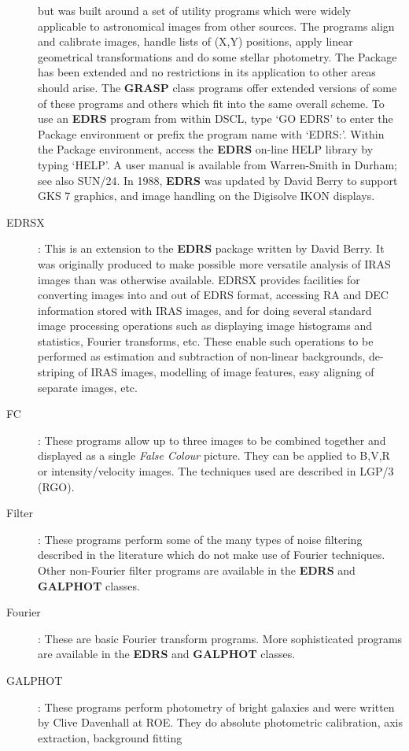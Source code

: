 \begin{description}
but was built around a set of utility programs which were widely applicable
to astronomical images from other sources.
The programs align and calibrate images, handle lists of (X,Y) positions, apply
linear geometrical transformations and do some stellar photometry.
The Package has been extended and no restrictions in its application to other
areas should arise.
The {\bf GRASP} class programs offer extended versions of some of these
programs and others which fit into the same overall scheme.
To use an {\bf EDRS} program from within DSCL, type `GO EDRS' to enter the
Package environment or prefix the program name with `EDRS:'.
Within the Package environment, access the {\bf EDRS} on-line HELP library by
typing `HELP'.
A user manual is available from Warren-Smith in Durham; see also SUN/24.
In 1988, {\bf EDRS} was updated by David Berry to support GKS 7 graphics, and
image handling on the Digisolve IKON displays.
\item [EDRSX]:
This is an extension to the {\bf EDRS} package written by David Berry.
It was originally produced to make possible more versatile analysis of IRAS
images than was otherwise available.
EDRSX provides facilities for converting images into and out of EDRS format,
accessing RA and DEC information stored with IRAS images, and for doing several
standard image processing operations such as displaying image histograms and
statistics, Fourier transforms, etc.
These enable such operations to be performed as estimation and subtraction of
non-linear backgrounds, de-striping of IRAS images, modelling of image
features, easy aligning of separate images, etc.
\item [FC]:
These programs allow up to three images to be combined together and displayed as
a single {\em False Colour} picture.
They can be applied to B,V,R or intensity/velocity images.
The techniques used are described in LGP/3 (RGO).
\item [Filter]:
These programs perform some of the many types of noise filtering described in
the literature which do not make use of Fourier techniques.
Other non-Fourier filter programs are available in the {\bf EDRS} and
{\bf GALPHOT} classes.
\item [Fourier]:
These are basic Fourier transform programs.
More sophisticated programs are available in the {\bf EDRS} and {\bf GALPHOT}
classes.
\item [GALPHOT]:
These programs perform photometry of bright galaxies and were written by
Clive Davenhall at ROE.
They do absolute photometric calibration, axis extraction, background fitting

\end{description}

